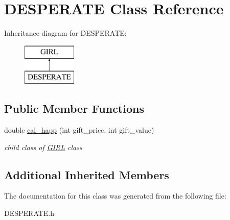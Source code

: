 \hypertarget{classDESPERATE}{}\section{D\+E\+S\+P\+E\+R\+A\+TE Class Reference}
\label{classDESPERATE}
Inheritance diagram for D\+E\+S\+P\+E\+R\+A\+TE\+:\begin{figure}[H]
\begin{center}
\leavevmode
\includegraphics[height=2.000000cm]{classDESPERATE}
\end{center}
\end{figure}
\subsection*{Public Member Functions}
\begin{DoxyCompactItemize}
\item 
\mbox{\label{classDESPERATE_a45cf54b78a2087c6935118bf4ba3f80b}} 
double \hyperlink{classDESPERATE_a45cf54b78a2087c6935118bf4ba3f80b}{cal\+\_\+happ} (int gift\+\_\+price, int gift\+\_\+value)
\begin{DoxyCompactList}\small\item\em child class of \hyperlink{classGIRL}{G\+I\+RL} class \end{DoxyCompactList}\end{DoxyCompactItemize}
\subsection*{Additional Inherited Members}


The documentation for this class was generated from the following file\+:\begin{DoxyCompactItemize}
\item 
D\+E\+S\+P\+E\+R\+A\+T\+E.\+h\end{DoxyCompactItemize}
